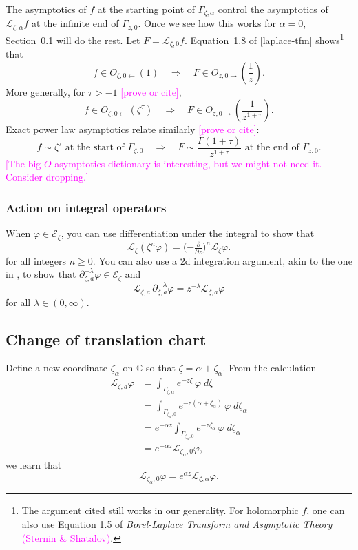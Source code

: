 \documentclass{article}
\theoremstyle{plain}
\newcommand{\C}{\mathbb{C}}
\newcommand{\laplace}{\mathcal{L}}
\newcommand{\fracderiv}[3]{\partial^{#1}_{#2, #3}}
\begin{document}
The asymptotics of $f$ at the starting point of $\Gamma_{\zeta, \alpha}$ control the asymptotics of $\laplace_{\zeta, \alpha} f$ at the infinite end of $\Gamma_{z, 0}$. Once we see how this works for $\alpha = 0$, Section~\ref{translation} will do the rest. Let $F = \laplace_{\zeta, 0} f$. Equation~1.8 of \ref{laplace-tfm} shows\footnote{The argument cited still works in our generality. For holomorphic $f$, one can also use Equation 1.5 of {\em Borel-Laplace Transform and Asymptotic Theory} \textcolor{magenta}{(Sternin \& Shatalov)}.} that
\[ f \in O_{\zeta, 0 \leftarrow}(1) \quad\Longrightarrow\quad F \in O_{z, 0 \rightarrow}\left(\frac{1}{z}\right). \]
More generally, for $\tau > -1$ \textcolor{magenta}{[prove or cite]},
\[ f \in O_{\zeta, 0 \leftarrow}(\zeta^\tau) \quad\Longrightarrow\quad F \in O_{z, 0 \rightarrow}\left(\frac{1}{z^{1 + \tau}}\right). \]
Exact power law asymptotics relate similarly \textcolor{magenta}{[prove or cite]}:
\[ f \sim \zeta^\tau \text{ at the start of } \Gamma_{\zeta, 0} \quad\Longrightarrow\quad F \sim \frac{\Gamma(1+\tau)}{z^{1+\tau}} \text{ at the end of } \Gamma_{z, 0}. \]
\textcolor{magenta}{[The big-$O$ asymptotics dictionary is interesting, but we might not need it. Consider dropping.]}
\subsubsection{Action on integral operators}\label{L-int-op}
When $\varphi \in \mathcal{E}_\zeta$, you can use differentiation under the integral to show that~\cite[Theorem~1.34]{laplace-tfm}
\begin{equation}%
\laplace_\zeta (\zeta^n \varphi) = \big({-\tfrac{\partial}{\partial z}}\big)^n \laplace_\zeta \varphi.
\end{equation}
for all integers $n \ge 0$. You can also use a 2d integration argument, akin to the one in \cite[Theorem~2.39]{laplace-tfm}, to show that $\fracderiv{-\lambda}{\zeta}{a} \varphi \in \mathcal{E}_\zeta$ and
\[ \laplace_{\zeta, a}\,\fracderiv{-\lambda}{\zeta}{a} \varphi = z^{-\lambda} \laplace_{\zeta, a} \varphi \]
for all $\lambda \in (0, \infty)$.
\subsection{Change of translation chart}\label{translation}
Define a new coordinate $\zeta_\alpha$ on $\C$ so that $\zeta = \alpha + \zeta_\alpha$. From the calculation
\begin{align*}
\laplace_{\zeta, a} \varphi & = \int_{\Gamma_{\zeta, \alpha}} e^{-z \zeta}\,\varphi\;d\zeta \\
& = \int_{\Gamma_{\zeta_\alpha, 0}} e^{-z(\alpha + \zeta_\alpha)}\,\varphi\;d\zeta_\alpha \\
& = e^{-\alpha z} \int_{\Gamma_{\zeta_\alpha, 0}} e^{-z\zeta_\alpha}\,\varphi\;d\zeta_\alpha \\
& = e^{-\alpha z} \laplace_{\zeta_\alpha, 0} \varphi,
\end{align*}
we learn that
\[ \laplace_{\zeta_\alpha, 0} \varphi = e^{\alpha z} \laplace_{\zeta, \alpha} \varphi. \]
\end{document}
